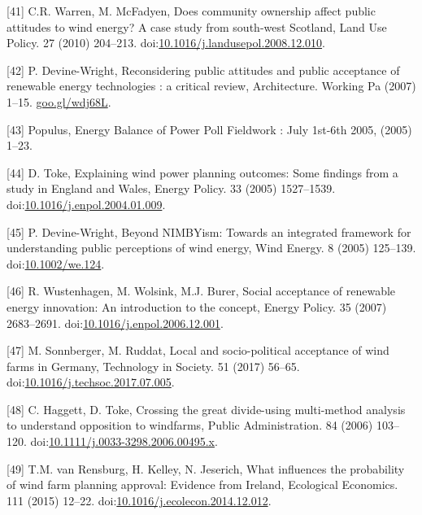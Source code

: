 \documentclass[a4paper,]{article}
\theoremstyle{definition}
\theoremstyle{definition}
\theoremstyle{definition}
\theoremstyle{remark}
\begin{document}
\hypertarget{ref-Warren2010}{}
{[}41{]} C.R. Warren, M. McFadyen, Does community ownership affect
public attitudes to wind energy? A case study from south-west Scotland,
Land Use Policy. 27 (2010) 204--213.
doi:\href{https://doi.org/10.1016/j.landusepol.2008.12.010}{10.1016/j.landusepol.2008.12.010}.

\hypertarget{ref-Devine-Wright2007}{}
{[}42{]} P. Devine-Wright, Reconsidering public attitudes and public
acceptance of renewable energy technologies : a critical review,
Architecture. Working Pa (2007) 1--15. \url{goo.gl/wdj68L}.

\hypertarget{ref-Populus2005}{}
{[}43{]} Populus, Energy Balance of Power Poll Fieldwork : July 1st-6th
2005, (2005) 1--23.

\hypertarget{ref-Toke2005}{}
{[}44{]} D. Toke, Explaining wind power planning outcomes: Some findings
from a study in England and Wales, Energy Policy. 33 (2005) 1527--1539.
doi:\href{https://doi.org/10.1016/j.enpol.2004.01.009}{10.1016/j.enpol.2004.01.009}.

\hypertarget{ref-Devine-Wright2005a}{}
{[}45{]} P. Devine-Wright, Beyond NIMBYism: Towards an integrated
framework for understanding public perceptions of wind energy, Wind
Energy. 8 (2005) 125--139.
doi:\href{https://doi.org/10.1002/we.124}{10.1002/we.124}.

\hypertarget{ref-Wustenhagen2007}{}
{[}46{]} R. Wustenhagen, M. Wolsink, M.J. Burer, Social acceptance of
renewable energy innovation: An introduction to the concept, Energy
Policy. 35 (2007) 2683--2691.
doi:\href{https://doi.org/10.1016/j.enpol.2006.12.001}{10.1016/j.enpol.2006.12.001}.

\hypertarget{ref-Sonnberger2017}{}
{[}47{]} M. Sonnberger, M. Ruddat, Local and socio-political acceptance
of wind farms in Germany, Technology in Society. 51 (2017) 56--65.
doi:\href{https://doi.org/10.1016/j.techsoc.2017.07.005}{10.1016/j.techsoc.2017.07.005}.

\hypertarget{ref-Haggett2006}{}
{[}48{]} C. Haggett, D. Toke, Crossing the great divide-using
multi-method analysis to understand opposition to windfarms, Public
Administration. 84 (2006) 103--120.
doi:\href{https://doi.org/10.1111/j.0033-3298.2006.00495.x}{10.1111/j.0033-3298.2006.00495.x}.

\hypertarget{ref-VanRensburg20}{}
{[}49{]} T.M. van Rensburg, H. Kelley, N. Jeserich, What influences the
probability of wind farm planning approval: Evidence from Ireland,
Ecological Economics. 111 (2015) 12--22.
doi:\href{https://doi.org/10.1016/j.ecolecon.2014.12.012}{10.1016/j.ecolecon.2014.12.012}.
\end{document}
